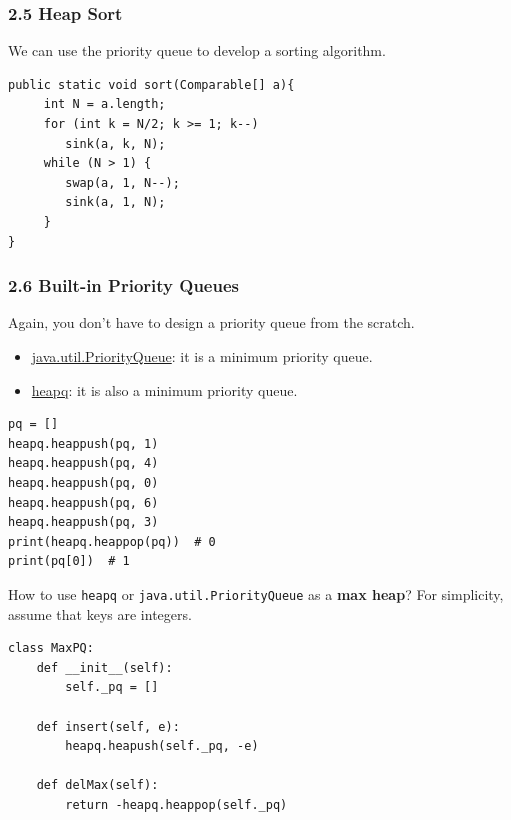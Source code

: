 \documentclass[aspectratio=169, 14pt]{beamer}
\begin{document}
\begin{frame}[fragile]
    \frametitle{2.5 Heap Sort}
We can use the priority queue to develop a sorting algorithm.

\begin{verbatim}
public static void sort(Comparable[] a){
     int N = a.length;
     for (int k = N/2; k >= 1; k--)
        sink(a, k, N);
     while (N > 1) {
        swap(a, 1, N--);
        sink(a, 1, N);
     }
}
\end{verbatim} 
\end{frame}

\begin{frame}[fragile]
    \frametitle{2.6 Built-in Priority Queues}
Again, you don't have to design a priority queue from the scratch.

\begin{itemize}
    \item {} \href{https://docs.oracle.com/en/java/javase/11/docs/api/java.base/java/util/PriorityQueue.html}{java.util.PriorityQueue}: it is a minimum priority queue.
    \item {} \href{https://docs.python.org/3/library/heapq.html}{heapq}: it is also a minimum priority queue.
\end{itemize}

\begin{verbatim}
pq = []
heapq.heappush(pq, 1)
heapq.heappush(pq, 4)
heapq.heappush(pq, 0)
heapq.heappush(pq, 6)
heapq.heappush(pq, 3)
print(heapq.heappop(pq))  # 0
print(pq[0])  # 1
\end{verbatim} 

\end{frame}

\begin{frame}[fragile]
 How to use \texttt{heapq} or \texttt{java.util.PriorityQueue} as a \textbf{max heap}? For simplicity, assume that keys are integers.
    
\pause

\begin{verbatim}
class MaxPQ:
    def __init__(self):
        self._pq = []
    
    def insert(self, e):
        heapq.heapush(self._pq, -e)
    
    def delMax(self):
        return -heapq.heappop(self._pq)
\end{verbatim}

\end{frame}
\end{document}

